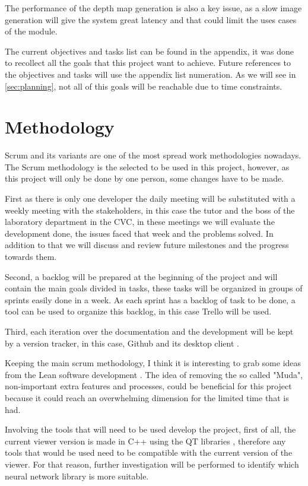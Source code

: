 \documentclass[10pt,a4paper,twocolumn,twoside]{article}
\begin{document}
	The performance of the depth map generation is also a key issue, as a slow image generation will give the system great latency and that could limit the uses cases of the module. 
	


	The current objectives and tasks list can be found in the appendix, it was done to recollect all the goals that this project want to achieve. Future references to the objectives and tasks will use the appendix list numeration. As we will see in \ref{sec:planning}, not all of this goals will be reachable due to time constraints.
	
	\section{Methodology}
	Scrum and its variants are one of the most spread work methodologies nowadays.
	The Scrum methodology is the selected to be used in this project, however, as this project will only be done by one person, some changes have to be made. 
	
	First as there is only one developer the daily meeting will be substituted with a weekly meeting with the stakeholders, in this case the tutor and the boss of the laboratory department in the CVC, in these meetings we will evaluate the development done, the issues faced that week and the problems solved. In addition to that we will discuss and review future milestones and the progress towards them.
	
	Second, a backlog will be prepared at the beginning of the project and will contain the main goals divided in tasks, these tasks will be organized in groups of sprints easily done in a week. As each sprint has a backlog of task to be done, a tool can be used to organize this backlog, in this case Trello\cite{web:trello} will be used.
	
	Third, each iteration over the documentation and the development will be kept by a version tracker, in this case, Github \cite{web:github} and its desktop client \cite{web:githubDesktop}. 
	
	Keeping the main scrum methodology, I think it is interesting to grab some ideas from the Lean software development \cite{web:leanMethod}. The idea of removing the so called "Muda", non-important extra features and processes, could be beneficial for this project because it could reach an overwhelming dimension for the limited time that is had.
	
	Involving the tools that will need to be used develop the project, first of all, the current viewer version is made in C++ using the QT libraries \cite{web:qt}, therefore any tools that would be used need to be compatible with the current version of the viewer. For that reason, further investigation will be performed to identify which neural network library is more suitable.
	
\end{document}
